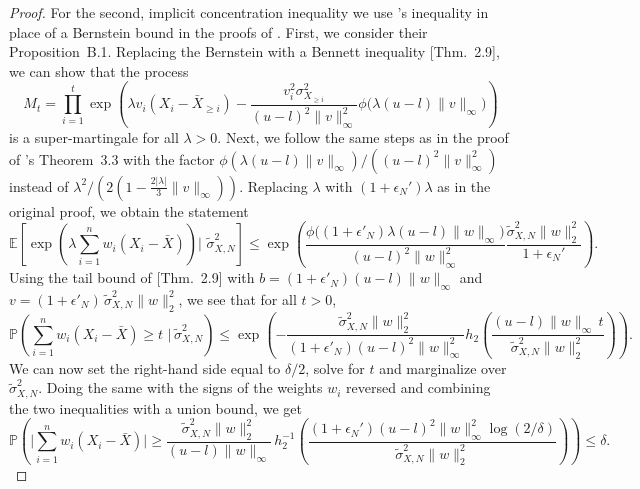 \documentclass[aos]{imsart2}
\theoremstyle{plain}
\theoremstyle{definition}
\newcommand{\PR}{\mathbb{P}}
\newcommand{\E}{\mathbb{E}}
\newcommand{\sigt}{\tilde{\sigma}}
\begin{document}
\begin{appendix}
\begin{proof}
    For the second, implicit concentration inequality we use \citet{bennett_1962}'s inequality in place of a Bernstein bound in the proofs of \cite{barber_hoeffding_2024}. First, we consider their Proposition~B.1. Replacing the Bernstein with a Bennett inequality \citep{boucheron_concentration_2013}[Thm.~2.9], we can show that the process 
    \begin{equation*}
        M_t = \prod_{i=1}^t \exp\left(\lambda v_i(X_i - \bar{X}_{\geq i}) - \frac{v_i^2\sigma^2_{X_{\geq i}}}{(u-l)^2\lVert v\rVert_\infty^2}\phi\Big(\lambda (u-l)\lVert v\rVert_\infty\Big)\right)
    \end{equation*}
    is a super-martingale for all $\lambda > 0$. Next, we follow the same steps as in the proof of \citeauthor{barber_hoeffding_2024}'s Theorem~3.3 with the factor $\phi(\lambda (u-l)\lVert v\rVert_\infty)/((u-l)^2\lVert v\rVert_\infty^2)$ instead of $\lambda^2/(2(1-\frac{2\lvert\lambda\rvert}{3}\lVert v \rVert_\infty))$. Replacing $\lambda$ with $(1+\epsilon_N')\lambda$ as in the original proof, we obtain the statement
    \begin{equation*}
        \E\left[\exp\left(\lambda \sum_{i=1}^n w_i (X_i-\bar{X})\right) \bigg\vert\,\, \sigt^2_{X,N}\right] \leq \exp\left( \frac{\phi\big((1+\epsilon'_N)\lambda(u-l)\lVert w \rVert_\infty\big)}{(u-l)^2\lVert w\rVert_\infty^2} \frac{\sigt^2_{X,N} \lVert w \rVert_2^2}{1+\epsilon_N'}\right).
    \end{equation*}
    Using the tail bound of \citet{boucheron_concentration_2013}[Thm.~2.9] with $b={(1+\epsilon'_N)}(u-l)\lVert w \rVert_\infty$ and  $v= (1+\epsilon'_N)\,\sigt^2_{X,N} \lVert w \rVert_2^2$, we see that for all $t>0$,
    \begin{equation*}
        \PR\left(\sum_{i=1}^n w_i (X_i-\bar{X}) \geq t\,\, \bigg \vert\, \sigt_{X,N}^2\right) \leq \exp\left(-\frac{\sigt^2_{X,N} \lVert w \rVert_2^2}{(1+\epsilon'_N)(u-l)^2\lVert w \rVert_\infty^2} h_2\left(\frac{(u-l)\lVert w \rVert_\infty \,t}{\sigt^2_{X,N} \lVert w \rVert_2^2}\right)\right).
    \end{equation*}
    We can now set the right-hand side equal to $\delta/2$, solve for $t$ and marginalize over $\sigt_{X,N}^2$. Doing the same with the signs of the weights $w_i$ reversed and combining the two inequalities with a union bound, we get
    \begin{equation*}
        \PR\left(\bigg\vert\sum_{i=1}^n w_i (X_i-\bar{X})\bigg\vert \geq \frac{\sigt^2_{X,N}\lVert w \rVert_2^2}{(u-l)\lVert w \rVert_\infty}\,h_2^{-1}\left(\frac{(1+\epsilon_N')(u-l)^2\lVert w\rVert^2_\infty\log(2/\delta)}{\sigt^2_{X,N}\lVert w \rVert_2^2}\right)\right) \leq \delta.
    \end{equation*}
\end{proof}


\end{appendix}
\end{document}

